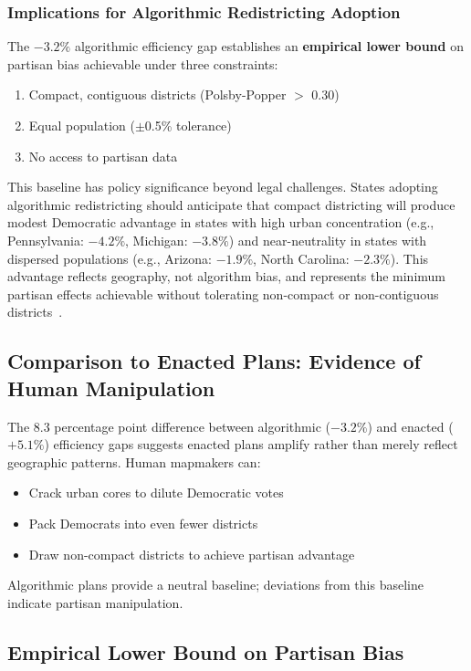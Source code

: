 \subsubsection{Implications for Algorithmic Redistricting Adoption}

The $-3.2\%$ algorithmic efficiency gap establishes an \textbf{empirical lower bound} on partisan bias achievable under three constraints:
\begin{enumerate}
    \item Compact, contiguous districts (Polsby-Popper $>$ 0.30)
    \item Equal population ($\pm$0.5\% tolerance)
    \item No access to partisan data
\end{enumerate}

This baseline has policy significance beyond legal challenges. States adopting algorithmic redistricting should anticipate that compact districting will produce modest Democratic advantage in states with high urban concentration (e.g., Pennsylvania: $-4.2\%$, Michigan: $-3.8\%$) and near-neutrality in states with dispersed populations (e.g., Arizona: $-1.9\%$, North Carolina: $-2.3\%$). This advantage reflects geography, not algorithm bias, and represents the minimum partisan effects achievable without tolerating non-compact or non-contiguous districts~\cite{chen2013unintentional,rodden2019cities}.

\subsection{Comparison to Enacted Plans: Evidence of Human Manipulation}

The 8.3 percentage point difference between algorithmic ($-3.2\%$) and enacted ($+5.1\%$) efficiency gaps suggests enacted plans amplify rather than merely reflect geographic patterns. Human mapmakers can:
\begin{itemize}
\item Crack urban cores to dilute Democratic votes
\item Pack Democrats into even fewer districts
\item Draw non-compact districts to achieve partisan advantage
\end{itemize}

Algorithmic plans provide a neutral baseline; deviations from this baseline indicate partisan manipulation.

\subsection{Empirical Lower Bound on Partisan Bias}

